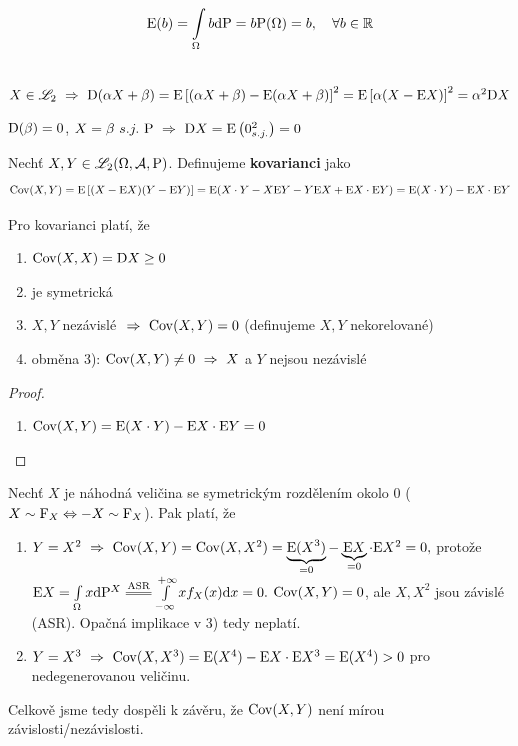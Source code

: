 \begin{remark}
	$$\mathrm{E} (b)=\int\limits_{\Omega}b \mathrm{d} \mathrm{P}=b\mathrm{P}(\Omega)=b, ~~~  \forall b\in\mathbb{R}$$
\end{remark}
\begin{theorem}~\newline
	$ X\in\mathscr{L}_2~\Rightarrow~ \mathrm{D} (\alpha X+\beta)=\mathrm{E} \left[ (\alpha X+\beta)-\mathrm{E} (\alpha X+\beta) \right]^2=\mathrm{E} \left[ \alpha(X-\mathrm{E} X) \right]^2=\alpha^2 \mathrm{D} X $
\end{theorem}
\begin{dusl}
	$ \mathrm{D} (\beta)=0 $, $ X=\beta~s.j.~\mathrm{P}~\Rightarrow~ \mathrm{D} X=\mathrm{E} \left(0_{s.j.}^2\right)=0 $
\end{dusl}
\begin{define}
	Nechť $X,Y\in\mathscr{L}_2(\Omega,\mathcal{A},\mathrm{P})$. Definujeme \textbf{kovarianci} jako \[
	\mathop{\mathrm{Cov}}(X,Y)=\mathrm{E} \left[ (X-\mathrm{E} X)(Y-\mathrm{E} Y) \right]=\mathrm{E} (X\cdot Y-X\mathrm{E} Y-Y\mathrm{E} X+\mathrm{E} X\cdot \mathrm{E} Y)=\mathrm{E} (X\cdot Y)-\mathrm{E} X\cdot \mathrm{E} Y
	\]
\end{define}
\begin{theorem}
	Pro kovarianci platí, že 
	\begin{enumerate}
		\item $ \mathop{\mathrm{Cov}}(X,X)=\mathrm{D} X\geq 0 $
		\item je symetrická
		\item $X,Y$ nezávislé $~\Rightarrow~ \mathop{\mathrm{Cov}}(X,Y)=0$ (definujeme $X,Y$ nekorelované)
		\item obměna 3): $\mathop{\mathrm{Cov}}(X,Y)\neq 0~\Rightarrow~ X$ a $Y$ nejsou nezávislé
	\end{enumerate}
	\begin{proof}
		\begin{enumerate}[3.]
			\item $\mathop{\mathrm{Cov}}(X,Y)=\mathrm{E} (X\cdot Y)-\mathrm{E} X\cdot \mathrm{E} Y=0$
		\end{enumerate}
	\end{proof}
\end{theorem}
\begin{example}	
	Nechť $X$ je náhodná veličina se symetrickým rozdělením okolo 0 \newline ($ X\sim \mathrm{F}_X \Leftrightarrow -X\sim \mathrm{F}_X $). Pak platí, že
	\begin{enumerate}
		\item $ Y=X^2 ~\Rightarrow~ \mathop{\mathrm{Cov}}(X,Y)=\mathop{\mathrm{Cov}}(X,X^2)=\underbrace{\mathrm{E} (X^3)}_{=0}-\underbrace{\mathrm{E} X}_{=0}\cdot \mathrm{E} X^2=0, $ protože \newline $\E X=\int\limits_{\Omega}x\dif \PP^X \equal{\text{ASR}}\int\limits_{-\infty}^{+\infty}xf_X(x)\dif x=0. $\newline
		$\mathop{\mathrm{Cov}}(X,Y)=0$, ale $X,X^2$ jsou závislé (ASR). Opačná implikace v 3) tedy neplatí. 
		\item $Y=X^3 ~\Rightarrow~ \mathop{\mathrm{Cov}}(X,X^3)=\mathrm{E} (X^4)-\mathrm{E} X\cdot \mathrm{E} X^3=\mathrm{E} (X^4)>0 $ pro nedegenerovanou veličinu.
	\end{enumerate}
	Celkově jsme tedy dospěli k závěru, že $\mathop{\mathrm{Cov}}(X,Y)$ není mírou závislosti/nezávislosti.
	
\end{example}
